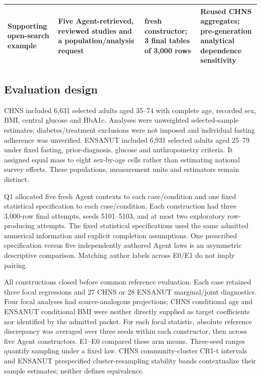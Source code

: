 \documentclass[10pt,twocolumn]{article}
\begin{document}
\begin{table}[t]
\begin{tabularx}{\textwidth}{@{}>{\raggedright\arraybackslash}X>{\raggedright\arraybackslash}X>{\raggedright\arraybackslash}X>{\raggedright\arraybackslash}X@{}}
Supporting open-search example & Five Agent-retrieved, reviewed studies and a population/analysis request & 1 fresh constructor; 3 final tables of 3,000 rows & Reused CHNS aggregates; pre-generation analytical dependence sensitivity \\

\bottomrule

\end{tabularx}

\end{table}

\subsection{Evaluation design}

CHNS included 6,631 selected adults aged 35–74 with complete age, recorded sex, BMI, central glucose and HbA1c. Analyses were unweighted selected-sample estimates; diabetes/treatment exclusions were not imposed and individual fasting adherence was unverified. ENSANUT included 6,931 selected adults aged 25–79 under fixed fasting, prior-diagnosis, glucose and anthropometry criteria. It assigned equal mass to eight sex-by-age cells rather than estimating national survey effects. These populations, measurement units and estimators remain distinct.


Q1 allocated five fresh Agent contexts to each case/condition and one fixed statistical specification to each case/condition. Each construction had three 3,000-row final attempts, seeds 5101–5103, and at most two exploratory row-producing attempts. The fixed statistical specifications used the same admitted numerical information and explicit completion assumptions. One prescribed specification versus five independently authored Agent laws is an asymmetric descriptive comparison. Matching author labels across E0/E1 do not imply pairing.


All constructions closed before common reference evaluation. Each case retained three focal regressions and 27 CHNS or 28 ENSANUT marginal/joint diagnostics. Four focal analyses had source-analogous projections; CHNS conditional age and ENSANUT conditional BMI were neither directly supplied as target coefficients nor identified by the admitted packet. For each focal statistic, absolute reference discrepancy was averaged over three seeds within each constructor, then across five Agent constructors. E1–E0 compared these arm means. Three-seed ranges quantify sampling under a fixed law. CHNS community-cluster CR1-t intervals and ENSANUT prespecified cluster-resampling stability bands contextualize their sample estimates; neither defines equivalence.
\end{document}
